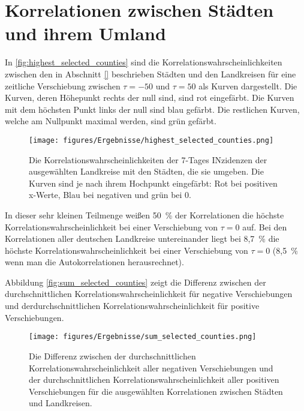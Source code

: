 \section{Korrelationen zwischen Städten und ihrem Umland}
In \autoref{fig:highest_selected_counties} sind die Korrelationswahrscheinlichkeiten zwischen den in Abschnitt \autoref{} beschrieben Städten und den Landkreisen für eine zeitliche Verschiebung zwischen $\tau=-50$ und $\tau=50$ als Kurven dargestellt.
Die Kurven, deren Höhepunkt rechts der null sind, sind rot eingefärbt. Die Kurven mit dem höchsten Punkt links der null sind blau gefärbt. Die restlichen Kurven, welche am Nullpunkt maximal werden, sind grün gefärbt.
\begin{figure}[H]
    \centering
    \texttt{[image: figures/Ergebnisse/highest\_selected\_counties.png]}
    \caption{Die Korrelationswahrscheinlichkeiten der 7-Tages INzidenzen der ausgewählten Landkreise mit den Städten, die sie umgeben. Die Kurven sind je nach ihrem Hochpunkt eingefärbt: Rot bei positiven x-Werte, Blau bei negativen und grün bei 0.}
    \label{fig:highest_selected_counties}
\end{figure}

In dieser sehr kleinen Teilmenge weißen 50~\% der Korrelationen die höchste Korrelationswahrscheinlichkeit bei einer Verschiebung von $\tau = 0$ auf.
Bei den Korrelationen aller deutschen Landkreise untereinander liegt bei 8,7~\% die höchste Korrelationswahrscheinlichkeit bei einer Verschiebung von $\tau= 0$ (8,5~\% wenn man die Autokorrelationen herausrechnet).

Abbildung \autoref{fig:sum_selected_counties} zeigt die Differenz zwischen der durchschnittlichen Korrelationswahrscheinlichkeit für negative Verschiebungen und derdurchschnittlichen Korrelationswahrscheinlichkeit für positive Verschiebungen.
\begin{figure}
    \centering
    \texttt{[image: figures/Ergebnisse/sum\_selected\_counties.png]}
    \caption{Die Differenz zwischen der durchschnittlichen Korrelationswahrscheinlichkeit aller negativen Verschiebungen und der durchschnittlichen Korrelationswahrscheinlichkeit aller positiven Verschiebungen für die ausgewählten Korrelationen zwischen Städten und Landkreisen.}
    \label{fig:sum_selected_counties}
\end{figure}